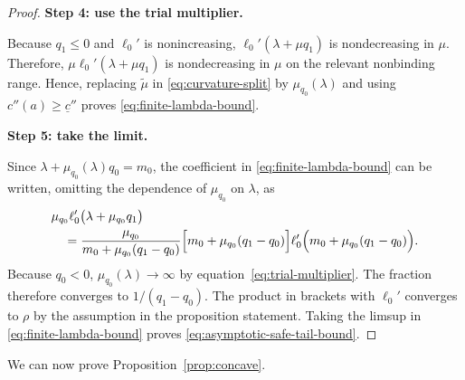 \begin{proof}
\noindent\textbf{Step 4: use the trial multiplier.}\par
Because $q_1\leq0$ and $\ell_0'$ is nonincreasing, $\ell_0'(\lambda+\mu q_1)$ is nondecreasing in $\mu$.  Therefore, $\mu\ell_0'(\lambda+\mu q_1)$ is nondecreasing in $\mu$ on the relevant nonbinding range.  Hence, replacing
$\widetilde\mu$ in \eqref{eq:curvature-split} by $\mu_{q_0}(\lambda)$ and
using $c''(a)\geq\underline c''$ proves
\eqref{eq:finite-lambda-bound}.

\noindent\textbf{Step 5: take the limit.}\par
Since $\lambda+\mu_{q_0}(\lambda)q_0=m_0$, the coefficient in
\eqref{eq:finite-lambda-bound} can be written, omitting the dependence of $\mu_{q_0}$ on $\lambda$, as
\begin{align*}
 &\mu_{q_0}
 \ell_0'\bigl(\lambda+\mu_{q_0}q_1\bigr)\\
 &\quad=
 \frac{\mu_{q_0}}
 {m_0+\mu_{q_0}(q_1-q_0)}
 \Bigl[m_0+\mu_{q_0}(q_1-q_0)\Bigr]
 \ell_0'\Bigl(m_0+\mu_{q_0}(q_1-q_0)\Bigr).
\end{align*}
Because $q_0<0$, $\mu_{q_0}(\lambda)\to\infty$ by equation~\eqref{eq:trial-multiplier}.  The fraction therefore
converges to $1/(q_1-q_0)$.  The product in brackets with $\ell_0'$
converges to $\rho$ by the assumption in the proposition statement.  Taking the limsup in \eqref{eq:finite-lambda-bound} proves
\eqref{eq:asymptotic-safe-tail-bound}.
\end{proof}

We can now prove Proposition~\ref{prop:concave}.

